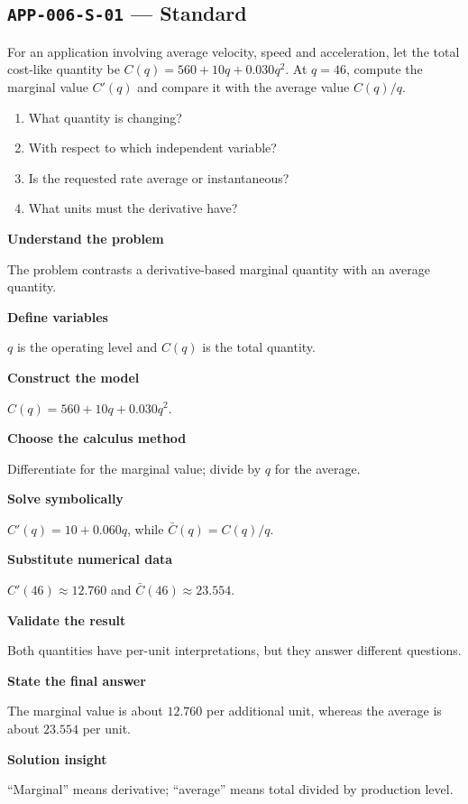 \documentclass[11pt]{book}
\newcommand{\pid}[1]{\texttt{#1}}
\begin{document}
\subsection*{\pid{APP-006-S-01} — Standard}
\begin{problembox}
For an application involving average velocity, speed and acceleration, let the total cost-like quantity be $C(q)=560+10q+0.030q^2$. At $q=46$, compute the marginal value $C'(q)$ and compare it with the average value $C(q)/q$.
\end{problembox}
\begin{promptbox}\begin{enumerate}
\item What quantity is changing?
\item With respect to which independent variable?
\item Is the requested rate average or instantaneous?
\item What units must the derivative have?
\end{enumerate}\end{promptbox}
\begin{solutionbox}
\textbf{Understand the problem}\par The problem contrasts a derivative-based marginal quantity with an average quantity.\par\medskip
\textbf{Define variables}\par $q$ is the operating level and $C(q)$ is the total quantity.\par\medskip
\textbf{Construct the model}\par $C(q)=560+10q+0.030q^2$.\par\medskip
\textbf{Choose the calculus method}\par Differentiate for the marginal value; divide by $q$ for the average.\par\medskip
\textbf{Solve symbolically}\par $C'(q)=10+0.060q$, while $\bar C(q)=C(q)/q$.\par\medskip
\textbf{Substitute numerical data}\par $C'(46)\approx 12.760$ and $\bar C(46)\approx 23.554$.\par\medskip
\textbf{Validate the result}\par Both quantities have per-unit interpretations, but they answer different questions.\par\medskip
\textbf{State the final answer}\par The marginal value is about $12.760$ per additional unit, whereas the average is about $23.554$ per unit.\par\medskip
\textbf{Solution insight}\par “Marginal” means derivative; “average” means total divided by production level.\par\medskip
\end{solutionbox}
\end{document}
